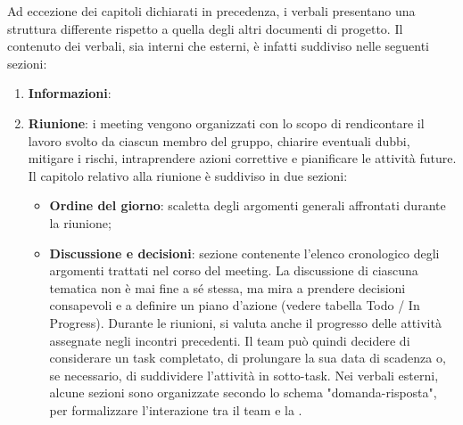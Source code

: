 \par Ad eccezione dei capitoli dichiarati in precedenza, i verbali presentano una struttura differente rispetto a quella degli altri documenti di progetto. Il contenuto dei verbali, sia interni che esterni, è infatti suddiviso nelle seguenti sezioni:
\begin{enumerate}
  \item \textbf{Informazioni}:
  \item \textbf{Riunione}: i meeting vengono organizzati con lo scopo di rendicontare il lavoro svolto da ciascun membro del gruppo, chiarire eventuali dubbi, mitigare i rischi, intraprendere azioni correttive e pianificare le attività future. Il capitolo relativo alla riunione è suddiviso in due sezioni:
  \begin{itemize}
    \item \textbf{Ordine del giorno}: scaletta degli argomenti generali affrontati durante la riunione;
    \item \textbf{Discussione e decisioni}: sezione contenente l'elenco cronologico degli argomenti trattati nel corso del meeting. La discussione di ciascuna tematica non è mai fine a sé stessa, ma mira a prendere decisioni consapevoli e a definire un piano d'azione (vedere tabella Todo / In Progress). Durante le riunioni, si valuta anche il progresso delle attività assegnate negli incontri precedenti. Il team può quindi decidere di considerare un task completato, di prolungare la sua data di scadenza o, se necessario, di suddividere l'attività in sotto-task. Nei verbali esterni, alcune sezioni sono organizzate secondo lo schema "domanda-risposta", per formalizzare l'interazione tra il team e la .

\end{itemize}
\end{enumerate}
